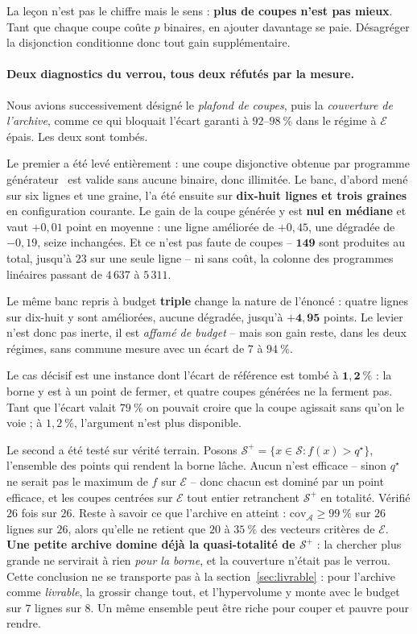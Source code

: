 \documentclass[11pt,a4paper]{article}
\theoremstyle{plain}
\theoremstyle{remark}
\newcommand{\Ecal}{\mathcal{E}}
\newcommand{\Scal}{\mathcal{S}}
\newcommand{\qs}{q^{\star}}
\newcommand{\Acal}{\mathcal{A}}
\begin{document}
\noindent
La leçon n'est pas le chiffre mais le sens : \textbf{plus de coupes n'est pas
mieux}. Tant que chaque coupe coûte $p$ binaires, en ajouter davantage se
paie. Désagréger la disjonction conditionne donc tout gain supplémentaire.

\paragraph{Deux diagnostics du verrou, tous deux réfutés par la mesure.}
Nous avions successivement désigné le \emph{plafond de coupes}, puis la
\emph{couverture de l'archive}, comme ce qui bloquait l'écart garanti à
$92$--$98\ \%$ dans le régime à $\Ecal$ épais. Les deux sont tombés.

Le premier a été levé entièrement : une coupe disjonctive obtenue par
programme générateur~\cite{balas1993} est valide sans aucune binaire, donc
illimitée. Le banc, d'abord mené sur six lignes et une graine, l'a été
ensuite sur \textbf{dix-huit lignes et trois graines} en configuration
courante. Le gain de la coupe générée y est \textbf{nul en médiane} et
vaut $+0{,}01$ point en moyenne : une ligne améliorée de $+0{,}45$, une
dégradée de $-0{,}19$, seize inchangées. Et ce n'est pas faute de coupes --
$\mathbf{149}$ sont produites au total, jusqu'à $23$ sur une seule ligne --
ni sans coût, la colonne des programmes linéaires passant de $4\,637$ à
$5\,311$.

Le même banc repris à budget \textbf{triple} change la nature de l'énoncé :
quatre lignes sur dix-huit y sont améliorées, aucune dégradée, jusqu'à
$\mathbf{+4{,}95}$ points. Le levier n'est donc pas inerte, il est
\emph{affamé de budget} -- mais son gain reste, dans les deux régimes, sans
commune mesure avec un écart de $7$ à $94\ \%$.

Le cas décisif est une instance dont l'écart de référence est tombé à
$\mathbf{1{,}2\ \%}$ : la borne y est à un point de fermer, et quatre
coupes générées ne la ferment pas. Tant que l'écart valait $79\ \%$ on
pouvait
croire que la coupe agissait sans qu'on le voie ; à $1{,}2\ \%$, l'argument
n'est plus disponible.

Le second a été testé sur vérité terrain. Posons
$\Scal^{+}=\{x\in\Scal: f(x)>\qs\}$, l'ensemble des points qui rendent la
borne lâche. Aucun n'est efficace -- sinon $\qs$ ne serait pas le maximum de
$f$ sur $\Ecal$ -- donc chacun est dominé par un point efficace, et les
coupes centrées sur $\Ecal$ tout entier retranchent $\Scal^{+}$ en totalité.
Vérifié $26$ fois sur $26$. Reste à savoir ce que l'archive en atteint :
$\text{cov}_{\Acal}\ge 99\ \%$ sur $26$ lignes sur $26$, alors qu'elle ne
retient que $20$ à $35\ \%$ des vecteurs critères de $\Ecal$. \textbf{Une
petite archive domine déjà la quasi-totalité de $\Scal^{+}$} : la chercher
plus grande ne servirait à rien \emph{pour la borne}, et la couverture
n'était pas le verrou. Cette conclusion ne se transporte pas à la
section~\ref{sec:livrable} : pour l'archive comme \emph{livrable}, la
grossir change tout, et l'hypervolume y monte avec le budget sur $7$ lignes
sur $8$. Un même ensemble peut être riche pour couper et pauvre pour
rendre.
\end{document}
